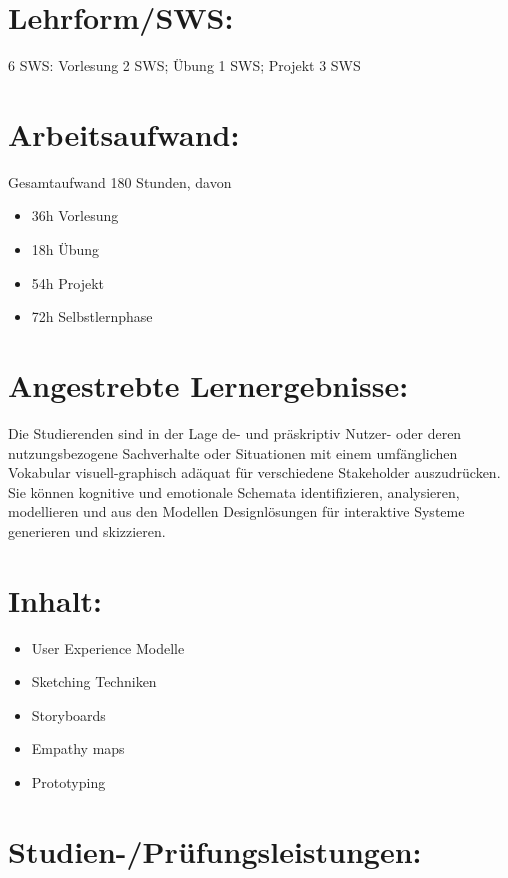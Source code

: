 \section*{Lehrform/SWS:}\label{lehrformsws-7}

6 SWS: Vorlesung 2 SWS; Übung 1 SWS; Projekt 3 SWS

\section*{Arbeitsaufwand:}\label{arbeitsaufwand-8}

Gesamtaufwand 180 Stunden, davon

\begin{itemize}
\tightlist
\item
  36h Vorlesung
\item
  18h Übung
\item
  54h Projekt
\item
  72h Selbstlernphase
\end{itemize}

\section*{Angestrebte
Lernergebnisse:}\label{angestrebte-lernergebnisse-7}

Die Studierenden sind in der Lage de- und präskriptiv Nutzer- oder deren
nutzungsbezogene Sachverhalte oder Situationen mit einem umfänglichen
Vokabular visuell-graphisch adäquat für verschiedene Stakeholder
auszudrücken. Sie können kognitive und emotionale Schemata
identifizieren, analysieren, modellieren und aus den Modellen
Designlösungen für interaktive Systeme generieren und skizzieren.

\section*{Inhalt:}\label{inhalt-7}

\begin{itemize}
\tightlist
\item
  User Experience Modelle
\item
  Sketching Techniken
\item
  Storyboards
\item
  Empathy maps
\item
  Prototyping
\end{itemize}

\section*{Studien-/Prüfungsleistungen:}\label{studien-pruxfcfungsleistungen-7}

